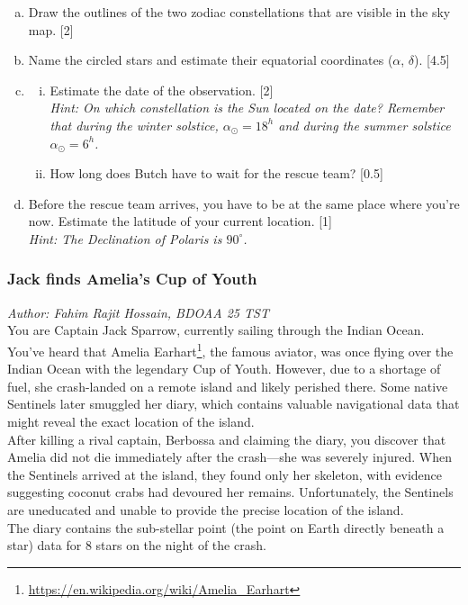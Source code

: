 \documentclass[a4paper,12pt]{extarticle}
\begin{document}
\begin{enumerate}[(a)]
	\item Draw the outlines of the two zodiac constellations that are visible in the sky map. \hfill[2]
	\item Name the circled stars and estimate their equatorial coordinates ($\alpha$, $\delta$). \hfill[4.5]
	\item 
	\begin{enumerate}[(i)]
		\item Estimate the date of the observation. \hfill[2]\\
		\textit{Hint: On which constellation is the Sun located on the date? Remember that during the winter solstice, $\alpha_\odot = 18^h$ and during the summer solstice $\alpha_\odot = 6^h$.}
		\item How long does Butch have to wait for the rescue team? \hfill[0.5]
	\end{enumerate}
	\item Before the rescue team arrives, you have to be at the same place where you're now. Estimate the latitude of your current location. \hfill[1]\\
	\textit{Hint: The Declination of Polaris is $90^\circ$.}
\end{enumerate}

\subsubsection{Jack finds Amelia's Cup of Youth}
\textit{Author: Fahim Rajit Hossain, BDOAA 25 TST}\\

{ \footnotesize
You are Captain Jack Sparrow, currently sailing through the Indian Ocean. You've heard that Amelia Earhart\footnote{\url{https://en.wikipedia.org/wiki/Amelia_Earhart}}, the famous aviator, was once flying over the Indian Ocean with the legendary Cup of Youth. However, due to a shortage of fuel, she crash-landed on a remote island and likely perished there. Some native Sentinels later smuggled her diary, which contains valuable navigational data that might reveal the exact location of the island.\\

After killing a rival captain, Berbossa and claiming the diary, you discover that Amelia did not die immediately after the crash—she was severely injured. When the Sentinels arrived at the island, they found only her skeleton, with evidence suggesting coconut crabs had devoured her remains. Unfortunately, the Sentinels are uneducated and unable to provide the precise location of the island.\\

The diary contains the sub-stellar point (the point on Earth directly beneath a star) data for 8 stars on the night of the crash.}
\end{document}
